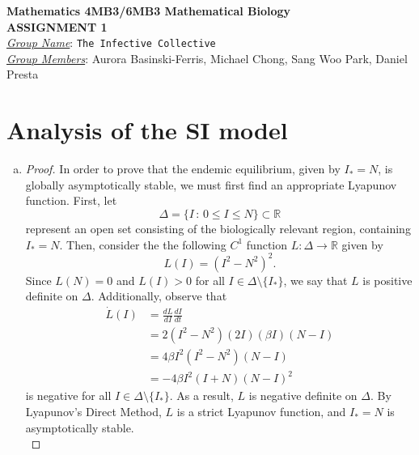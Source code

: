 \documentclass[12pt]{article}
\begin{document}
\begin{center}
{\bfseries Mathematics 4MB3/6MB3 Mathematical Biology\\
 ASSIGNMENT {\color{blue}1}}\\
\medskip
\underline{\emph{Group Name}}: \texttt{{\color{blue}The Infective Collective}}\\
\medskip
\underline{\emph{Group Members}}: {\color{blue} Aurora Basinski-Ferris, Michael Chong, Sang Woo Park, Daniel Presta}
\end{center}

\section{Analysis of the SI model}

\SIanalIntro
\begin{enumerate}[(a)]
\item \SIanalQa
  
  {\color{blue}
    \begin{proof}
      In order to prove that the endemic equilibrium, given by $I_\ast = N$, is globally asymptotically stable, we must first find an appropriate Lyapunov function. First, let 
\begin{equation*}
\Delta = \{I \,:\, 0 \leq I \leq N\} \subset \mathbb{R}
\end{equation*}
represent an open set consisting of the biologically relevant region, containing $I_\ast = N$. Then, consider the the following $C^1$ function $L: \Delta \to \mathbb{R}$ given by
\begin{equation*}
L(I) = (I^2 - N^2)^2.
\end{equation*}
Since $L(N) = 0$ and $L(I) > 0$ for all $I \in \Delta \setminus \{I_\ast\}$, we say that $L$ is positive definite on $\Delta$. Additionally, observe that
\begin{equation*}
\begin{aligned}
\dot{L}(I) &= \frac{dL}{dI} \frac{dI}{dt} \\
&= 2(I^2 - N^2)(2 I)(\beta I)(N-I) \\
&= 4 \beta I^2 (I^2 - N^2)(N-I)\\
& = - 4 \beta I^2  (I+N) (N-I)^2
\end{aligned}
\end{equation*}
is negative for all $I \in \Delta \setminus \{I_\ast\}$. As a result, $L$ is negative definite on $\Delta$. By Lyapunov's Direct Method, $L$ is a strict Lyapunov function, and $I_\ast=N$ is asymptotically stable. \\


\end{proof}}
\end{enumerate}
\end{document}
